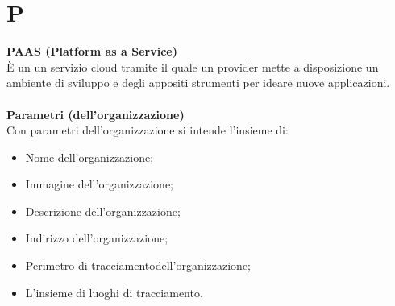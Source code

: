 \section{P}
\textbf{PAAS (Platform as a Service)}\\
È un un servizio cloud tramite il quale un provider mette a disposizione un ambiente di sviluppo e degli appositi strumenti per ideare nuove applicazioni. \\ \\
\textbf{Parametri (dell'organizzazione)}\\
Con parametri dell'organizzazione si intende l'insieme di:
\begin{itemize}
    \item Nome dell'organizzazione;
    \item Immagine dell'organizzazione;
    \item Descrizione dell'organizzazione;
    \item Indirizzo dell'organizzazione;
    \item Perimetro di tracciamentodell'organizzazione;
    \item L'insieme di luoghi di tracciamento.
\end{itemize} \mbox{} \\ \\

